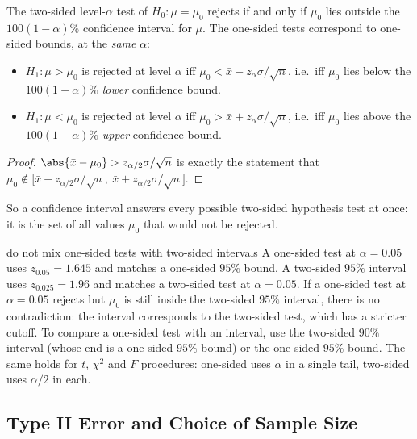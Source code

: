 \begin{theorem}[Duality]\label{thm:duality}
The two-sided level-$\alpha$ test of $H_0:\mu=\mu_0$ rejects if and only if $\mu_0$ lies outside the $100(1-\alpha)\%$ confidence interval for $\mu$. The one-sided tests correspond to one-sided bounds, at the \emph{same} $\alpha$:
\begin{itemize}
  \item $H_1:\mu>\mu_0$ is rejected at level $\alpha$ iff $\mu_0<\bar{x}-z_\alpha\sigma/\sqrt n$, i.e.\ iff $\mu_0$ lies below the $100(1-\alpha)\%$ \emph{lower} confidence bound.
  \item $H_1:\mu<\mu_0$ is rejected at level $\alpha$ iff $\mu_0>\bar{x}+z_\alpha\sigma/\sqrt n$, i.e.\ iff $\mu_0$ lies above the $100(1-\alpha)\%$ \emph{upper} confidence bound.
\end{itemize}
\end{theorem}

\begin{proof}
$\abs{\bar{x}-\mu_0}>z_{\alpha/2}\sigma/\sqrt n$ is exactly the statement that $\mu_0\notin\big[\bar{x}-z_{\alpha/2}\sigma/\sqrt n,\ \bar{x}+z_{\alpha/2}\sigma/\sqrt n\big]$.
\end{proof}

So a confidence interval answers every possible two-sided hypothesis test at once: it is the set of all values $\mu_0$ that would not be rejected.

\begin{pitfall}{do not mix one-sided tests with two-sided intervals}
A one-sided test at $\alpha=0.05$ uses $z_{0.05}=1.645$ and matches a one-sided $95\%$ bound. A two-sided $95\%$ interval uses $z_{0.025}=1.96$ and matches a two-sided test at $\alpha=0.05$. If a one-sided test at $\alpha=0.05$ rejects but $\mu_0$ is still inside the two-sided $95\%$ interval, there is no contradiction: the interval corresponds to the two-sided test, which has a stricter cutoff. To compare a one-sided test with an interval, use the two-sided $90\%$ interval (whose end is a one-sided $95\%$ bound) or the one-sided $95\%$ bound. The same holds for $t$, $\chi^2$ and $F$ procedures: one-sided uses $\alpha$ in a single tail, two-sided uses $\alpha/2$ in each.
\end{pitfall}

\subsection{Type II Error and Choice of Sample Size}

